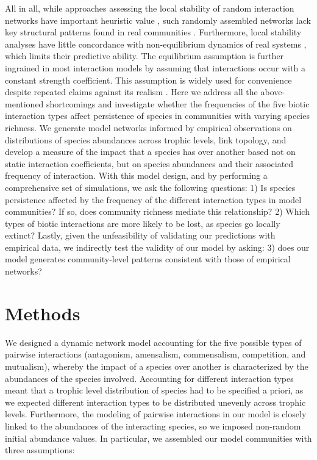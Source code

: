 All in all, while approaches assessing the local stability of random interaction networks have important heuristic value \citep{Allesina2012,Allesina2015}, such randomly assembled networks lack key structural patterns found in real communities \citep{Jacquet2016}. Furthermore, local stability analyses have little concordance with non-equilibrium dynamics of real systems \citep{Pimm1982,Chen2001}, which limits their predictive ability. The equilibrium assumption is further ingrained in most interaction models by assuming that interactions occur with a constant strength coefficient. This assumption is widely used for convenience despite repeated claims against its realism \citep{Abrams1980,Abrams2001,Hernandez1998,Holland2009}. Here we address all the above-mentioned shortcomings and investigate whether the frequencies of the five biotic interaction types affect persistence of species in communities with varying species richness. We generate model networks informed by empirical observations on distributions of species abundances across trophic levels, link topology, and develop a measure of the impact that a species has over another based not on static interaction coefficients, but on species abundances and their associated frequency of interaction. With this model design, and by performing a comprehensive set of simulations, we ask the following questions: 1) Is species persistence affected by the frequency of the different interaction types in model communities? If so, does community richness mediate this relationship? 2) Which types of biotic interactions are more likely to be lost, as species go locally extinct? Lastly, given the unfeasibility of validating our predictions with empirical data, we indirectly test the validity of our model by asking: 3) does our model generates community-level patterns consistent with those of empirical networks?

\section{Methods}

We designed a dynamic network model accounting for the five possible types of pairwise interactions (antagonism, amensalism, commensalism, competition, and mutualism), whereby the impact of a species over another is characterized by the abundances of the species involved. Accounting for different interaction types meant that a trophic level distribution of species had to be specified a priori, as we expected different interaction types to be distributed unevenly across trophic levels. Furthermore, the modeling of pairwise interactions in our model is closely linked to the abundances of the interacting species, so we imposed non-random initial abundance values. In particular, we assembled our model communities with three assumptions:

